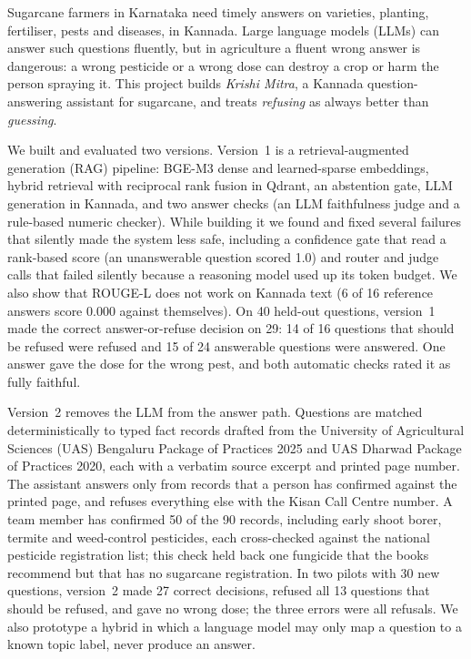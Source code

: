 Sugarcane farmers in Karnataka need timely answers on varieties, planting, fertiliser,
pests and diseases, in Kannada. Large language models (LLMs) can answer such questions
fluently, but in agriculture a fluent wrong answer is dangerous: a wrong pesticide or a
wrong dose can destroy a crop or harm the person spraying it. This project builds
\emph{Krishi Mitra}, a Kannada question-answering assistant for sugarcane, and treats
\emph{refusing} as always better than \emph{guessing}.

We built and evaluated two versions. Version~1 is a retrieval-augmented generation (RAG)
pipeline: BGE-M3 dense and learned-sparse embeddings, hybrid retrieval with reciprocal
rank fusion in Qdrant, an abstention gate, LLM generation in Kannada, and two answer
checks (an LLM faithfulness judge and a rule-based numeric checker). While building it we
found and fixed several failures that silently made the system less safe, including a
confidence gate that read a rank-based score (an unanswerable question scored 1.0) and
router and judge calls that failed silently because a reasoning model used up its token
budget. We also show that ROUGE-L does not work on Kannada text (6 of 16 reference answers
score 0.000 against themselves). On 40 held-out questions, version~1 made the correct
answer-or-refuse decision on 29: 14 of 16 questions that should be refused were refused and
15 of 24 answerable questions were answered. One answer gave the dose for the wrong pest,
and both automatic checks rated it as fully faithful.

Version~2 removes the LLM from the answer path. Questions are matched deterministically to
typed fact records drafted from the University of Agricultural Sciences (UAS) Bengaluru
Package of Practices 2025 and UAS Dharwad Package of Practices 2020, each with a verbatim
source excerpt and printed page number. The assistant answers only from records that a
person has confirmed against the printed page, and refuses everything else with the Kisan
Call Centre number. A team member has confirmed 50 of the 90 records, including early shoot
borer, termite and weed-control pesticides, each cross-checked against the national
pesticide registration list; this check held back one fungicide that the books recommend
but that has no sugarcane registration. In two pilots with 30 new questions, version~2 made
27 correct decisions, refused all 13 questions that should be refused, and gave no wrong
dose; the three errors were all refusals. We also prototype a hybrid in which a language
model may only map a question to a known topic label, never produce an answer.
